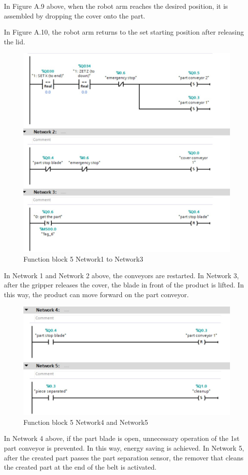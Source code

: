 In Figure A.9 above, when the robot arm reaches the desired position, it is assembled by dropping the cover onto the part.

In Figure A.10, the robot arm returns to the set starting position after releasing the lid.

\begin{figure}[H]
    \centering
    \includegraphics[width=0.60\columnwidth]{imgs/io/tia7.1.jpg}
    \caption[Function block 5 Network1 to Network3]{Function block 5 Network1 to Network3}
    \label{fig-magnitude}
\end{figure}%

In Network 1 and Network 2 above, the conveyors are restarted. In Network 3, after the gripper releases the cover, the blade in front of the product is lifted. In this way, the product can move forward on the part conveyor.

\begin{figure}[H]
    \centering
    \includegraphics[width=0.60\columnwidth]{imgs/io/tia7.2.jpg}
    \caption[Function block 5 Network4 and Network5]{Function block 5 Network4 and Network5}
    \label{fig-magnitude}
\end{figure}%

In Network 4 above, if the part blade is open, unnecessary operation of the 1st part conveyor is prevented. In this way, energy saving is achieved. In Network 5, after the created part passes the part separation sensor, the remover that cleans the created part at the end of the belt is activated.

